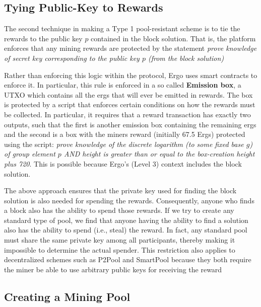 \documentclass[11pt]{article}
\newcommand{\authnote}[2]{\marginpar{\parbox{\marginparwidth}{\tiny %
  \textsf{#1 {\textcolor{blue}{notes: #2}}}}}%
  \textcolor{blue}{\textbf{\dag}}}
\newcommand{\authnote}[2]{
  \textsf{#1 \textcolor{blue}{: #2}}}
\newcommand{\authnote}[2]{}
\newcommand{\snote}[1]{{\authnote{\textcolor{red}{Scalahub notes}}{#1}}}
\begin{document}

\subsection{Tying Public-Key to Rewards}

The second technique in making a Type 1 pool-resistant scheme is to tie the rewards to the public key $p$ contained in the block solution. That is, the platform enforces that any mining rewards are protected by the statement {\em prove knowledge of secret key corresponding to the public key $p$ (from the block solution)}

\snote{Maybe make this section less Ergo-specific}

Rather than enforcing this logic within the protocol, Ergo uses smart contracts to enforce it. In particular, this rule is enforced in a so called \textbf{Emission box}, a UTXO which contains all the ergs that will ever be emitted in rewards. The box is protected by a script that enforces certain conditions on how the rewards must be collected. In particular, it requires that a reward transaction has exactly two outputs, such that the first is another emission box containing the remaining ergs and the second is a box with the miners reward (initially 67.5 Ergs) protected using the script: {\em prove knowledge of the discrete logarithm (to some fixed base $g$) of group element $p$ AND height is greater than or equal to the box-creation height plus 720}.
This is possible because Ergo's (Level 3) context includes the block solution.  

The above approach ensures that the private key used for finding the block solution is also needed for spending the rewards. Consequently, anyone who finds a block also has the ability to spend those rewards. 
If we try to create any standard type of pool, we find that anyone having the ability to find a solution also has the ability to spend (i.e., steal) the reward. In fact, any standard pool must share the same private key among all participants, thereby making it impossible to determine the actual spender. This restriction also applies to decentralized schemes such as P2Pool and SmartPool because they both require the miner be able to use arbitrary public keys for receiving the reward

\subsection{Creating a Mining Pool}
\end{document}
